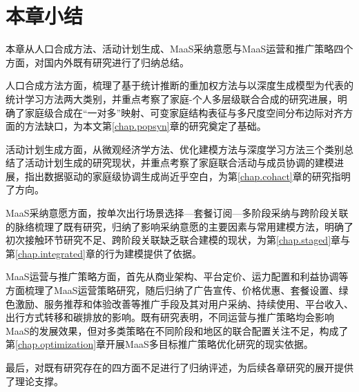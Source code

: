 \section{本章小结}\label{sec.review.summary}

本章从人口合成方法、活动计划生成、MaaS采纳意愿与MaaS运营和推广策略四个方面，对国内外既有研究进行了归纳总结。

人口合成方法方面，梳理了基于统计推断的重加权方法与以深度生成模型为代表的统计学习方法两大类别，并重点考察了家庭-个人多层级联合合成的研究进展，明确了家庭级合成在``一对多''映射、可变家庭结构表征与多尺度空间分布边际对齐方面的方法缺口，为本文第\ref{chap.popsyn}章的研究奠定了基础。

活动计划生成方面，从微观经济学方法、优化建模方法与深度学习方法三个类别总结了活动计划生成的研究现状，并重点考察了家庭联合活动与成员协调的建模进展，指出数据驱动的家庭级协调生成尚近乎空白，为第\ref{chap.cohact}章的研究指明了方向。

MaaS采纳意愿方面，按单次出行场景选择—套餐订阅—多阶段采纳与跨阶段关联的脉络梳理了既有研究，归纳了影响采纳意愿的主要因素与常用建模方法，明确了初次接触环节研究不足、跨阶段关联缺乏联合建模的现状，为第\ref{chap.staged}章与第\ref{chap.integrated}章的行为建模提供了依据。

MaaS运营与推广策略方面，首先从商业架构、平台定价、运力配置和利益协调等方面梳理了MaaS运营策略研究，随后归纳了广告宣传、价格优惠、套餐设置、绿色激励、服务推荐和体验改善等推广手段及其对用户采纳、持续使用、平台收入、出行方式转移和碳排放的影响。既有研究表明，不同运营与推广策略均会影响MaaS的发展效果，但对多类策略在不同阶段和地区的联合配置关注不足，构成了第\ref{chap.optimization}章开展MaaS多目标推广策略优化研究的现实依据。

最后，对既有研究存在的四方面不足进行了归纳评述，为后续各章研究的展开提供了理论支撑。
